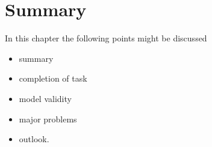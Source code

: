 \chapter{Summary}
\label{cha:summary}

In this chapter the following points might be discussed
\begin{itemize}
	\item summary
	\item completion of task
	\item model validity
	\item major problems
	\item outlook.
\end{itemize}